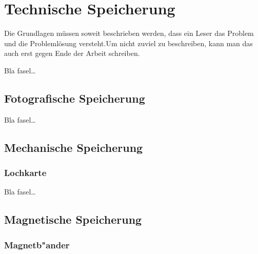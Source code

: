 
\chapter{Technische Speicherung}
\label{ch:Technische Speicherung}
Die Grundlagen müssen soweit beschrieben
werden, dass ein Leser das Problem und
die Problemlösung  versteht.Um nicht zuviel 
zu beschreiben, kann man das auch erst gegen 
Ende der Arbeit schreiben.

Bla fasel\ldots

    \section{Fotografische Speicherung}
    \label{ch:Technisch:sec:Fotografische Speicherung}
        
        Bla fasel\ldots
        
    \section{Mechanische Speicherung}
    \label{ch:Technisch:sec:Mechanische Speicherung}
        \subsection{Lochkarte}
        \label{ch:Technisch:sec:Mechanische Speicherung:sub:Lochkarte}
            
            Bla fasel\ldots
    
    
    \section{Magnetische Speicherung}
    \label{ch:Technisch:sec:Magnetische Speicherung}
        \subsection{Magnetb"ander}
        \label{ch:Technisch:sec:Magnetische Speicherung:sub:Magnetb"ander}
        
